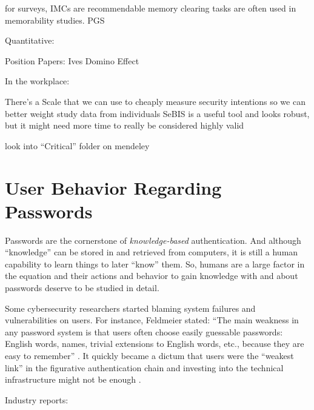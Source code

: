 for surveys, IMCs are recommendable \cite{Oppenheimer2009InstructionalManipulationChecks}
memory clearing tasks are often used in memorability studies.
PGS 


Quantitative: 


Position Papers:
Ives Domino Effect \cite{Ives2004DominoEffectReuse}

In the workplace: \cite{Adams1997MakingPWsSecureAndUsable, Inglesant2010TrueCostOfUnusablePolicies}



			
	
	There's a Scale that we can use to cheaply measure security intentions so we can better weight study data from individuals \cite{Egelman2015SeBIS}
	SeBIS is a useful tool and looks robust, but it might need more time to really be considered highly valid \cite{Egelman2016BehaviorEverFollows}

	look into ``Critical'' folder on mendeley

	
\section{User Behavior Regarding Passwords}\label{sec:rw:user-behavior}
Passwords are the cornerstone of \textit{knowledge-based} authentication. And although ``knowledge'' can be stored in and retrieved from computers, it is still a human capability to learn things to later ``know'' them. So, humans are a large factor in the equation and their actions and behavior to gain knowledge with and about passwords deserve to be studied in detail. 

Some cybersecurity researchers started blaming system failures and vulnerabilities on users. For instance, Feldmeier \etal stated: ``The main weakness in any password system is that users often choose easily guessable passwords: English words, names, trivial extensions to English words, etc., because they are easy to remember'' \cite{Feldmeier1990UnixPasswordSecurity}. It quickly became a dictum that users were the ``weakest link'' in the figurative authentication chain and investing into the technical infrastructure might not be enough \cite{Sasse2001WeakestLink}. 


Industry reports: \cite{CSID2012PasswordHabits}


